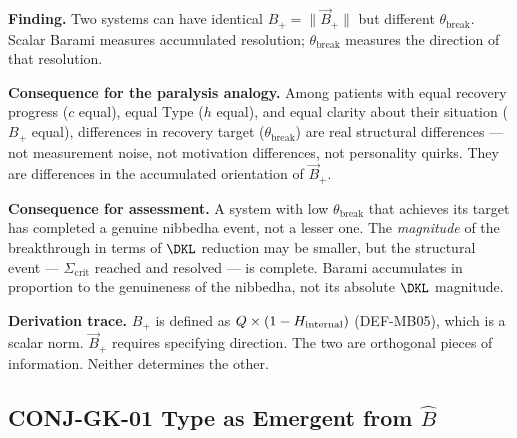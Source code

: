 \documentclass[12pt, a4paper]{article}
\providecommand{\Bplus}{B_{+}}
\providecommand{\Bvec}{\vec{B}_{+}}
\providecommand{\tbreak}{\theta_{\mathrm{break}}}
\providecommand{\Sigcrit}{\Sigma_{\mathrm{crit}}}
\begin{document}
\begin{derivedbox}[title={FIND-GK-01: $\tbreak$ Independent
  of Scalar Barami $\|\Bplus\|$}]
\textbf{Finding.}
Two systems can have identical $\Bplus = \|\Bvec\|$ but
different $\tbreak$. Scalar Barami measures accumulated
resolution; $\tbreak$ measures the direction of that
resolution.

\textbf{Consequence for the paralysis analogy.}
Among patients with equal recovery progress ($c$ equal),
equal Type ($h$ equal), and equal clarity about their
situation ($\Bplus$ equal), differences in recovery
target ($\tbreak$) are real structural differences ---
not measurement noise, not motivation differences,
not personality quirks. They are differences in the
accumulated orientation of $\Bvec$.

\textbf{Consequence for assessment.}
A system with low $\tbreak$ that achieves its target
has completed a genuine nibbedha event, not a lesser one.
The \emph{magnitude} of the breakthrough in terms of
$\DKL$ reduction may be smaller, but the structural
event --- $\Sigcrit$ reached and resolved --- is complete.
Barami accumulates in proportion to the genuineness of
the nibbedha, not its absolute $\DKL$ magnitude.

\textbf{Derivation trace.}
$\Bplus$ is defined as $Q \times (1-H_{\rm internal})$
(DEF-MB05), which is a scalar norm. $\Bvec$ requires
specifying direction. The two are orthogonal pieces of
information. Neither determines the other.
\end{derivedbox}

\subsection{CONJ-GK-01 \quad Type as Emergent from \texorpdfstring{$\hat{B}$}{B}}

\end{document}

